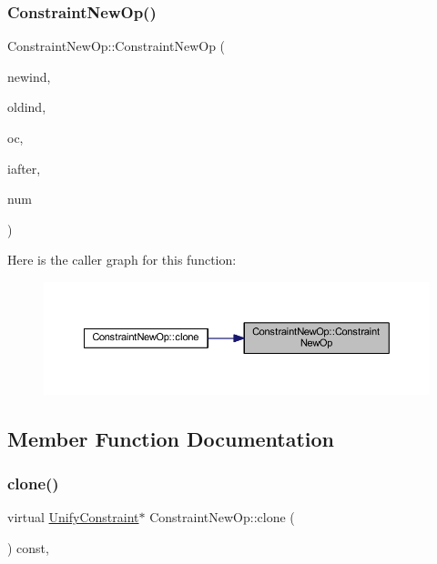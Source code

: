 \subsubsection{\texorpdfstring{ConstraintNewOp()}{ConstraintNewOp()}}
{\footnotesize\ttfamily Constraint\+New\+Op\+::\+Constraint\+New\+Op (\begin{DoxyParamCaption}\item[{int4}]{newind,  }\item[{int4}]{oldind,  }\item[{\mbox{\hyperlink{opcodes_8hh_abeb7dfb0e9e2b3114e240a405d046ea7}{Op\+Code}}}]{oc,  }\item[{bool}]{iafter,  }\item[{int4}]{num }\end{DoxyParamCaption})}

Here is the caller graph for this function\+:
\nopagebreak
\begin{figure}[H]
\begin{center}
\leavevmode
\includegraphics[width=350pt]{class_constraint_new_op_a9396e173813e0869d859cd37dafbd541_icgraph}
\end{center}
\end{figure}


\subsection{Member Function Documentation}
\mbox{\label{class_constraint_new_op_a5a9a1b594f9843f8365dfaaaa836675e}} 
\subsubsection{\texorpdfstring{clone()}{clone()}}
{\footnotesize\ttfamily virtual \mbox{\hyperlink{class_unify_constraint}{Unify\+Constraint}}$\ast$ Constraint\+New\+Op\+::clone (\begin{DoxyParamCaption}\item[{void}]{ }\end{DoxyParamCaption}) const\hspace{0.3cm}{\ttfamily [inline]}, {\ttfamily [virtual]}}



